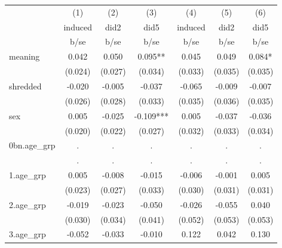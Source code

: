 {
\def\sym#1{\ifmmode^{#1}\else\(^{#1}\)\fi}
\begin{tabular}{l*{6}{c}}
\hline\hline
            &\multicolumn{1}{c}{(1)}&\multicolumn{1}{c}{(2)}&\multicolumn{1}{c}{(3)}&\multicolumn{1}{c}{(4)}&\multicolumn{1}{c}{(5)}&\multicolumn{1}{c}{(6)}\\
            &\multicolumn{1}{c}{induced}&\multicolumn{1}{c}{did2}&\multicolumn{1}{c}{did5}&\multicolumn{1}{c}{induced}&\multicolumn{1}{c}{did2}&\multicolumn{1}{c}{did5}\\
            &        b/se   &        b/se   &        b/se   &        b/se   &        b/se   &        b/se   \\
\hline
meaning     &       0.042   &       0.050   &       0.095** &       0.045   &       0.049   &       0.084*  \\
            &     (0.024)   &     (0.027)   &     (0.034)   &     (0.033)   &     (0.035)   &     (0.035)   \\
[1em]
shredded    &      -0.020   &      -0.005   &      -0.037   &      -0.065   &      -0.009   &      -0.007   \\
            &     (0.026)   &     (0.028)   &     (0.033)   &     (0.035)   &     (0.036)   &     (0.035)   \\
[1em]
sex         &       0.005   &      -0.025   &      -0.109***&       0.005   &      -0.037   &      -0.036   \\
            &     (0.020)   &     (0.022)   &     (0.027)   &     (0.032)   &     (0.033)   &     (0.034)   \\
[1em]
0bn.age\_grp &           .   &           .   &           .   &           .   &           .   &           .   \\
            &           .   &           .   &           .   &           .   &           .   &           .   \\
[1em]
1.age\_grp   &       0.005   &      -0.008   &      -0.015   &      -0.006   &      -0.001   &       0.005   \\
            &     (0.023)   &     (0.027)   &     (0.033)   &     (0.030)   &     (0.031)   &     (0.031)   \\
[1em]
2.age\_grp   &      -0.019   &      -0.023   &      -0.050   &      -0.026   &      -0.055   &       0.040   \\
            &     (0.030)   &     (0.034)   &     (0.041)   &     (0.052)   &     (0.053)   &     (0.053)   \\
[1em]
3.age\_grp   &      -0.052   &      -0.033   &      -0.010   &       0.122   &       0.042   &       0.130   \\

\end{tabular}}
